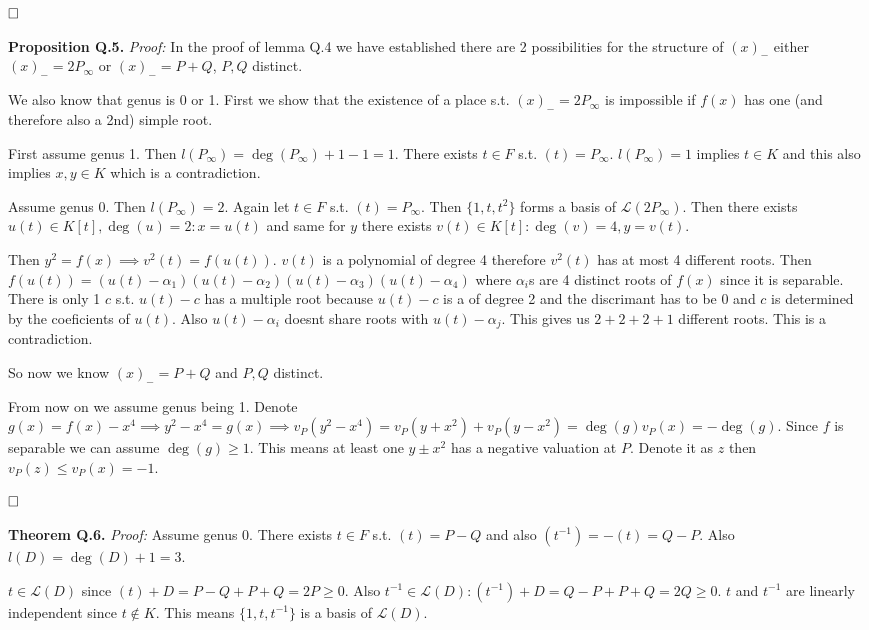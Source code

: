 \documentclass[12pt, a4paper]{article}
\newcommand{\qed}{\hfill\square}
\begin{document}
$\qed$

\textbf{Proposition Q.5.} \textit{Proof:}
In the proof of lemma Q.4 we have established there are 2 possibilities for the structure of $(x)_{-}$ either $(x)_{-}=2P_\infty$ or $(x)_{-} = P + Q$, $P,Q$ distinct. 

We also know that genus is 0 or 1. First we show that the existence of a place s.t. $(x)_{-}=2P_\infty$ is impossible if $f(x)$ has one (and therefore also a 2nd) simple root. 

First assume genus 1. Then $l(P_\infty) = \deg(P_\infty)+1-1=1$. There exists $t \in F$ s.t. $(t)=P_\infty$. $l(P_\infty) = 1$ implies $t \in K$ and this also implies $x,y \in K$ which is a contradiction.

Assume genus 0. Then $l(P_\infty) = 2$. Again let $t \in F$ s.t. $(t)=P_\infty$. Then $\{1, t, t^2\}$ forms a basis of $\mathcal{L}(2P_\infty)$. Then there exists $u(t) \in K[t], \deg(u)=2: x = u(t)$ and same for $y$ there exists $v(t) \in K[t]: \deg(v)=4, y=v(t)$. 

Then $y^2=f(x) \implies v^2(t)=f(u(t))$. $v(t)$ is a polynomial of degree 4 therefore $v^2(t)$ has at most 4 different roots. Then $f(u(t)) = (u(t)-\alpha_1) (u(t)-\alpha_2) (u(t)-\alpha_3) (u(t)-\alpha_4)$ where $\alpha_i$s are 4 distinct roots of $f(x)$ since it is separable. There is only 1 $c$ s.t. $u(t)-c$ has a multiple root because $u(t)-c$ is a of degree 2 and the discrimant has to be 0 and $c$ is determined by the coeficients of $u(t)$. Also $u(t)-\alpha_i$ doesnt share roots with $u(t)-\alpha_j$. This gives us $2+2+2+1$ different roots. This is a contradiction.

So now we know $(x)_{-} = P+Q$ and $P,Q$ distinct.

From now on we assume genus being 1. Denote $g(x)=f(x)-x^4 \implies y^2-x^4=g(x) \implies v_P(y^2-x^4)=v_P(y+x^2)+v_P(y-x^2)=\deg(g)v_P(x) = -\deg(g)$. Since $f$ is separable we can assume $\deg(g) \geq 1$. This means at least one $y \pm x^2$ has a negative valuation at $P$. Denote it as $z$ then $v_P(z) \leq v_P(x) = -1$. 

$\qed$


\textbf{Theorem Q.6.} \textit{Proof:}
Assume genus 0. There exists $t \in F$ s.t. $(t)=P-Q$ and also $(t^{-1})=-(t)=Q-P$. Also $l(D)=\deg(D)+1 = 3$. 

$t \in \mathcal{L}(D)$ since $(t)+D = P-Q+P+Q=2P \geq 0$. Also $t^{-1} \in \mathcal{L}(D): (t^{-1})+D=Q-P+P+Q = 2Q \geq 0$. $t$ and $t^{-1}$ are linearly independent since $t \notin K$. This means $\{1,t,t^{-1}\}$ is a basis of $\mathcal{L}(D)$.
\end{document}
